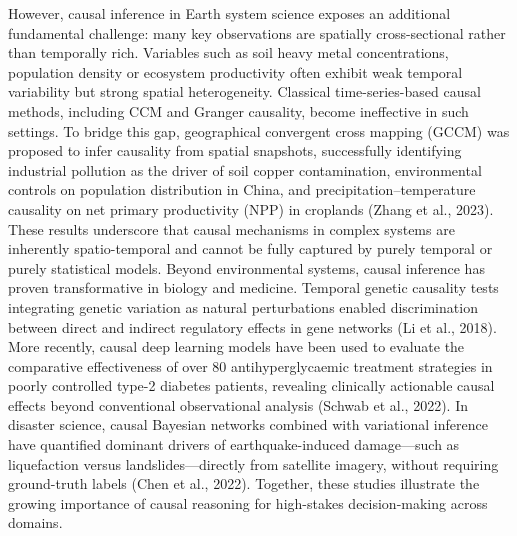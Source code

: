 \documentclass{article}
\begin{document}
However, causal inference in Earth system science exposes an additional fundamental challenge: many key observations are spatially cross-sectional rather than temporally rich. Variables such as soil heavy metal concentrations, population density or ecosystem productivity often exhibit weak temporal variability but strong spatial heterogeneity. Classical time-series-based causal methods, including CCM and Granger causality, become ineffective in such settings. To bridge this gap, geographical convergent cross mapping (GCCM) was proposed to infer causality from spatial snapshots, successfully identifying industrial pollution as the driver of soil copper contamination, environmental controls on population distribution in China, and precipitation–temperature causality on net primary productivity (NPP) in croplands (Zhang et al., 2023). These results underscore that causal mechanisms in complex systems are inherently spatio-temporal and cannot be fully captured by purely temporal or purely statistical models. Beyond environmental systems, causal inference has proven transformative in biology and medicine. Temporal genetic causality tests integrating genetic variation as natural perturbations enabled discrimination between direct and indirect regulatory effects in gene networks (Li et al., 2018). More recently, causal deep learning models have been used to evaluate the comparative effectiveness of over 80 antihyperglycaemic treatment strategies in poorly controlled type-2 diabetes patients, revealing clinically actionable causal effects beyond conventional observational analysis (Schwab et al., 2022). In disaster science, causal Bayesian networks combined with variational inference have quantified dominant drivers of earthquake-induced damage—such as liquefaction versus landslides—directly from satellite imagery, without requiring ground-truth labels (Chen et al., 2022). Together, these studies illustrate the growing importance of causal reasoning for high-stakes decision-making across domains.
\end{document}
